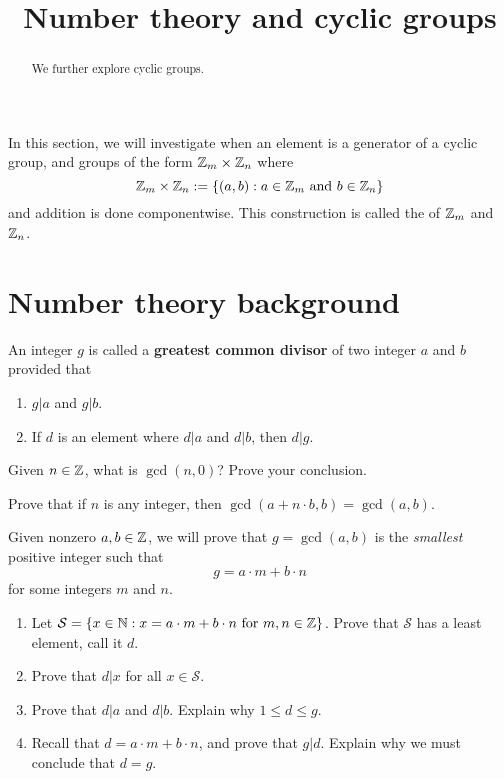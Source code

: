 \documentclass{ximera}
\title{Number theory and cyclic groups}
\begin{document}
\begin{abstract}
  We further explore cyclic groups.
\end{abstract}
\maketitle

In this section, we will investigate when an element is a generator of
a cyclic group, and groups of the form $\mathbb Z_m\times \mathbb Z_n$ where
\[
\mathbb Z_m\times \mathbb Z_n :=\{(a,b):\text{$a\in\mathbb Z_m$ and $b\in\mathbb Z_n$}\}
\]
and addition is done componentwise. This construction is called the
 of $\mathbb Z_m$ and $\mathbb Z_n$.




\section{Number theory background}

\begin{definition} 
An integer $g$ is called a \textbf{greatest common divisor} of two
integer $a$ and $b$ provided that
\begin{enumerate}
\item $g| a$ and $g | b$.
\item If $d$ is an element where $d| a$ and $d | b$, then $d| g$.
\end{enumerate}
\end{definition}

\begin{exercise} 
Given $n\in \mathbb Z$, what is $\gcd(n,0)$? Prove your conclusion.
\end{exercise}

\begin{exercise} 
Prove that if $n$ is any integer, then $\gcd(a + n\cdot b, b) = \gcd(a, b)$.
\end{exercise}




\begin{theorem}\label{T:EL1}
  Given nonzero $a,b\in\mathbb Z$, we will prove that $g=\gcd(a,b)$ is the
  \textit{smallest} positive integer such that
  \[
  g = a\cdot m +b\cdot n
  \]
  for some integers $m$ and $n$.
  \begin{enumerate}
  \item Let $\mathcal S = \{x\in \mathbb N: x = a\cdot m +b\cdot n\text{ for } m,n\in
    \mathbb Z\}$. Prove that $\mathcal S$ has a least element, call it $d$.
  \item Prove that $d| x$ for all $x\in \mathcal S$.
  \item Prove that $d| a$ and $d| b$. Explain why $1 \le d \le g$.
  \item Recall that $d = a\cdot m +b\cdot n$, and prove that $g |
    d$. Explain why we must conclude that $d = g$.
  \end{enumerate}
\end{theorem}
\end{document}

